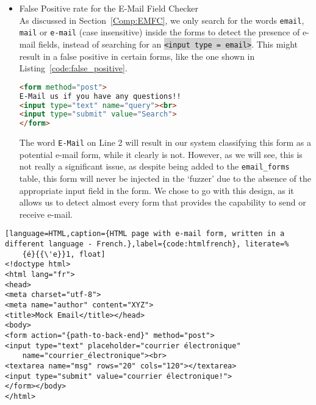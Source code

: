 \begin{itemize}
       	\item \label{issues:fpr}False Positive rate for the E-Mail Field Checker\\
       	As discussed in Section~\ref{Comp:EMFC}, we only search for the words \texttt{email}, \texttt{mail} or \texttt{e-mail} (case insensitive) inside the forms to detect the presence of e-mail fields, instead of searching for an \colorbox{lightgray}{\lstinline{<input type = email>}}. This might result in a false positive in certain forms, like the one shown in Listing~\ref{code:false_positive}.

       	\begin{lstlisting}[language=HTML,caption={E-Mail field checker
              - false positives, the system incorrectly classifies
              this as an e-mail form.},label={code:false_positive}, float]
<form method="post">
E-Mail us if you have any questions!!
<input type="text" name="query"><br>
<input type="submit" value="Search">
</form>
       	\end{lstlisting}

       	The word \texttt{E-Mail} on Line 2 will result in our system classifying this form as a potential e-mail form, while it clearly is not. However, as we will see, this is not really a significant issue, as despite being added to the \texttt{email\_forms} table, this form will never be injected in the `fuzzer' due to the absence of the appropriate input field in the form. We chose to go with this design, as it allows us to detect almost every form that provides the capability to send or receive e-mail.
	\end{itemize}


\begin{lstlisting}[language=HTML,caption={HTML page with e-mail form, written in a different language - French.},label={code:htmlfrench}, literate=%
	{é}{{\'e}}1, float]
<!doctype html>
<html lang="fr">
<head>
<meta charset="utf-8">
<meta name="author" content="XYZ">
<title>Mock Email</title></head>
<body>
<form action="{path-to-back-end}" method="post">
<input type="text" placeholder="courrier électronique"
	name="courrier_électronique"><br>
<textarea name="msg" rows="20" cols="120"></textarea>
<input type="submit" value="courrier électronique!">
</form></body>
</html>
\end{lstlisting}

